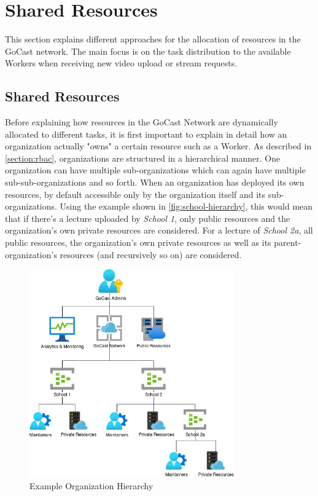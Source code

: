 \section{Shared Resources}\label{section:shared-resources}

This section explains different approaches for the allocation of resources in the GoCast network. The main focus is on the task distribution to the available Workers when receiving new video upload or stream requests.

\subsection{Shared Resources}

Before explaining how resources in the GoCast Network are dynamically allocated to different tasks, it is first important to explain in detail how an organization actually "owns" a certain resource such as a Worker. As described in \autoref{section:rbac}, organizations are structured in a hierarchical manner. One organization can have multiple sub-organizations which can again have multiple sub-sub-organizations and so forth. When an organization has deployed its own resources, by default accessible only by the organization itself and its sub-organizations. Using the example shown in \autoref{fig:school-hierarchy}, this would mean that if there's a lecture uploaded by \textit{School 1}, only public resources and the organization's own private resources are considered. For a lecture of \textit{School 2a}, all public resources, the organization's own private resources as well as its parent-organization's resources (and recursively so on) are considered. 

\begin{figure}[htpb]
    \centering
    \includegraphics[width=250pt]{images/SchoolHierarchy.png}
    \caption[Example Organization Hierarchy]{Example Organization Hierarchy}\label{fig:school-hierarchy}
\end{figure}

